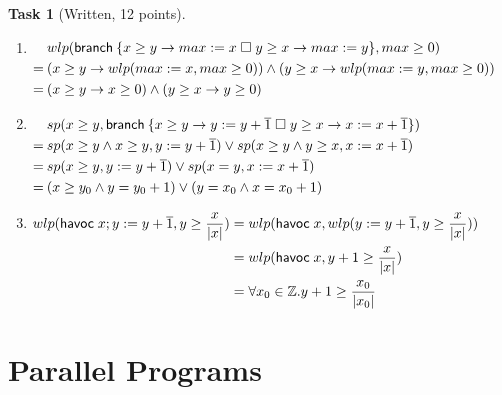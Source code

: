 \documentclass{article}
\newcommand{\z}{\mathbb{Z}}
\newcommand{\stmt}[1]{\text{\sffamily #1}}
\newcommand{\assign}[2]{#1 := #2}
\newcommand{\const}[1]{\overline{#1}}
\newcommand{\havoc}[1]{\ensuremath{\stmt{havoc}\; #1}}
\theoremstyle{task}
\newtheorem{task}{Task}[section]
\begin{document}
\begin{task}[Written, 12 points]\
    \begin{enumerate}
        \item
            $
            \!
            \begin{aligned}[t]
                &wlp(\stmt{branch}\: \{x \geq y \rightarrow \assign{max}{x} \;\square\; y \geq x \rightarrow \assign{max}{y}\}, max \geq 0) \\
                =\:& (x \geq y \rightarrow wlp(\assign{max}{x}, max \geq 0)) \wedge (y \geq x \rightarrow wlp(\assign{max}{y}, max \geq 0)) \\
                =\:& (x \geq y \rightarrow x \geq 0) \wedge (y \geq x \rightarrow y \geq 0)
            \end{aligned}
            $
        \item
            $
            \!
            \begin{aligned}[t]
                &sp(x \geq y, \stmt{branch}\: \{x \geq y \rightarrow \assign{y}{y + \const{1}} \;\square\; y \geq x \rightarrow \assign{x}{x + \const{1}}\}) \\
                =\:& sp(x \geq y \wedge x \geq y, \assign{y}{y + \const{1}}) \vee sp(x \geq y \wedge y \geq x, \assign{x}{x + \const{1}}) \\
                =\:& sp(x \geq y, \assign{y}{y + \const{1}}) \vee sp(x = y, \assign{x}{x + \const{1}}) \\
                =\:& (x \geq y_0 \wedge y = y_0 + 1) \vee (y = x_0 \wedge x = x_0 + 1)
            \end{aligned}
            $
        \item
            $
            \!
            \begin{aligned}[t]
                wlp(\havoc{x}; \assign{y}{y + \const{1}}, y \geq \frac{x}{|x|}) &= wlp(\havoc{x}, wlp(\assign{y}{y + \const{1}}, y \geq \frac{x}{|x|})) \\
                                                                                &= wlp(\havoc{x}, y + 1 \geq \frac{x}{|x|}) \\
                                                                                &= \forall x_0 \in \z. y + 1 \geq \frac{x_0}{|x_0|}
            \end{aligned}
            $
    \end{enumerate}
\end{task}

\section{Parallel Programs}
\end{document}
